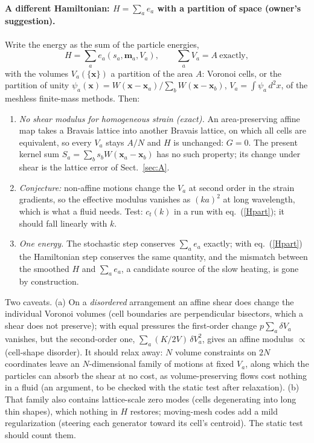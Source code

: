 \documentclass[11pt,aps,preprint,nofootinbib,superscriptaddress,tightenlines]{revtex4-2}
\def\st{\begin{equation}}
\def\stp{\end{equation}}
\def\Eq#1{eq.~(\ref{#1})}
\def\Sect#1{Sect.~\ref{#1}}
\let\oldparagraph\paragraph
\renewcommand{\paragraph}{\par\bigskip\oldparagraph}
\begin{document}
\paragraph{A different Hamiltonian: $H=\sum_ae_a$ with a partition of space (owner's suggestion).}
Write the energy as the sum of the particle energies,
\st
H=\sum_ae_a(s_a,\bm m_a,V_a),\qquad \sum_aV_a=A\ \text{exactly},
\label{Hpart}
\stp
with the volumes $V_a(\{\bm x\})$ a partition of the area $A$: Voronoi cells, or the partition of
unity $\psi_a(\bm x)=W(\bm x-\bm x_a)/\sum_bW(\bm x-\bm x_b)$, $V_a=\int\psi_a\,d^2x$, of the
meshless finite-mass methods.  Then:
\begin{enumerate}
\item \emph{No shear modulus for homogeneous strain (exact).}  An area-preserving affine map takes
  a Bravais lattice into another Bravais lattice, on which all cells are equivalent, so every
  $V_a$ stays $A/N$ and $H$ is unchanged: $G=0$.  The present kernel sum
  $S_a=\sum_bs_bW(\bm x_a-\bm x_b)$ has no such property; its change under shear is the lattice
  error of \Sect{sec:A}.
\item \emph{Conjecture:} non-affine motions change the $V_a$ at second order in the strain
  gradients, so the effective modulus vanishes as $(ka)^2$ at long wavelength, which is what a
  fluid needs.  Test: $c_t(k)$ in a run with \Eq{Hpart}; it should fall linearly with $k$.
\item \emph{One energy.}  The stochastic step conserves $\sum_ae_a$ exactly; with \Eq{Hpart} the
  Hamiltonian step conserves the same quantity, and the mismatch between the smoothed $H$ and
  $\sum_ae_a$, a candidate source of the slow heating, is gone by construction.
\end{enumerate}
Two caveats.  (a) On a \emph{disordered} arrangement an affine shear does change the
individual Voronoi volumes (cell boundaries are perpendicular bisectors, which a shear does not
preserve); with equal pressures the first-order change $p\sum_a\delta V_a$ vanishes, but the
second-order one, $\sum_a(K/2V)\,\delta V_a^2$, gives an affine modulus $\propto$ (cell-shape
disorder).  It should relax away: $N$ volume constraints on $2N$ coordinates leave an
$N$-dimensional family of motions at fixed $V_a$, along which the particles can absorb the
shear at no cost, as volume-preserving flows cost nothing in a fluid (an argument, to be
checked with the static test after relaxation).  (b) That family also contains lattice-scale
zero modes (cells degenerating into long thin shapes), which nothing in $H$ restores; moving-mesh
codes add a mild regularization (steering each generator toward its cell's centroid).  The
static test should count them.
\end{document}
